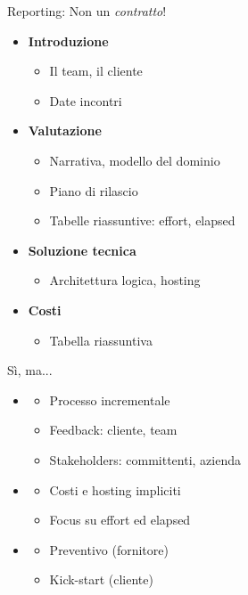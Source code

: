 	\begin{frame}{Reporting: Non un \emph{contratto}!}
		\begin{itemize}
			\item \textbf{Introduzione}
			\begin{itemize}
				\item Il team, il cliente
				\item Date incontri
			\end{itemize}

			\item \textbf{Valutazione}
			\begin{itemize}
				\item Narrativa, modello del dominio
				\item Piano di rilascio
				\item Tabelle riassuntive: effort, elapsed
			\end{itemize}

			\item \textbf{Soluzione tecnica}
			\begin{itemize}
				\item Architettura logica, hosting
			\end{itemize}

			\item \textbf{Costi}
			\begin{itemize}
				\item Tabella riassuntiva
			\end{itemize}
		\end{itemize}
	\end{frame}
	
	\begin{frame}{Sì, ma...}
		\begin{itemize}
			\item {}
				\begin{itemize}
					\item Processo incrementale
					\item Feedback: cliente, team
					\item Stakeholders: committenti, azienda
				\end{itemize}
			\item {}
				\begin{itemize}
					\item Costi e hosting impliciti
					\item Focus su effort ed elapsed
				\end{itemize}
			\item {}
				\begin{itemize}
					\item Preventivo (fornitore)
					\item Kick-start (cliente)
				\end{itemize}
		\end{itemize}
	\end{frame}

